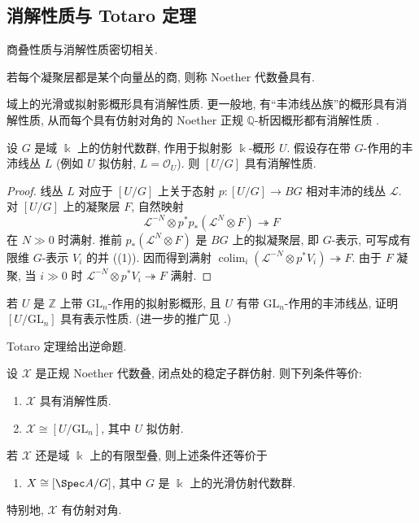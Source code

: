\subsection{消解性质与 Totaro 定理}\label{src:7.2.2-subsection}
商叠性质与消解性质密切相关.
\begin{definition}\label{src:7.2.9}
若每个凝聚层都是某个向量丛的商, 则称 Noether 代数叠具有.
\end{definition}
域上的光滑或拟射影概形具有消解性质. 更一般地, 有``丰沛线丛族''的概形具有消解性质, 从而每个具有仿射对角的 Noether 正规 $\mathbb Q$-析因概形都有消解性质 \cite{BS03}.
\begin{proposition}\label{src:7.2.10}
设 $G$ 是域 $\Bbbk$ 上的仿射代数群, 作用于拟射影 $\Bbbk$-概形 $U$. 假设存在带 $G$-作用的丰沛线丛 $L$ (例如 $U$ 拟仿射, $L=\mathcal O_U$). 则 $[U/G]$ 具有消解性质.
\end{proposition}
\begin{proof}
线丛 $L$ 对应于 $[U/G]$ 上关于态射 $p:[U/G]\to BG$ 相对丰沛的线丛 $\mathcal L$. 对 $[U/G]$ 上的凝聚层 $F$, 自然映射
\[
\mathcal L^{-N}\otimes p^*p_*(\mathcal L^N\otimes F)\twoheadrightarrow F
\]
在 $N\gg0$ 时满射. 推前 $p_*(\mathcal L^N\otimes F)$ 是 $BG$ 上的拟凝聚层, 即 $G$-表示, 可写成有限维 $G$-表示 $V_i$ 的并 ((1)). 因而得到满射 $\operatorname{colim}_i(\mathcal L^{-N}\otimes p^*V_i)\twoheadrightarrow F$. 由于 $F$ 凝聚, 当 $i\gg0$ 时 $\mathcal L^{-N}\otimes p^*V_i\twoheadrightarrow F$ 满射.
\end{proof}
\begin{exercise}\label{src:7.2.11}
若 $U$ 是 $\mathbb Z$ 上带 $\mathrm{GL}_n$-作用的拟射影概形, 且 $U$ 有带 $\mathrm{GL}_n$-作用的丰沛线丛, 证明 $[U/\mathrm{GL}_n]$ 具有表示性质. (进一步的推广见 \cite[\S2]{Tho87}.)
\end{exercise}
Totaro 定理给出逆命题.
\begin{theorem}[Totaro 定理]\label{src:7.2.12}
设 $\mathcal X$ 是正规 Noether 代数叠, 闭点处的稳定子群仿射. 则下列条件等价:
\begin{enumerate}[(1)]
\item $\mathcal X$ 具有消解性质.
\item $\mathcal X\cong[U/\mathrm{GL}_n]$, 其中 $U$ 拟仿射.
\end{enumerate}
若 $\mathcal X$ 还是域 $\Bbbk$ 上的有限型叠, 则上述条件还等价于
\begin{enumerate}[(3)]
\item $\mathcal X\cong[\Spec A/G]$, 其中 $G$ 是 $\Bbbk$ 上的光滑仿射代数群.
\end{enumerate}
特别地, $\mathcal X$ 有仿射对角.
\end{theorem}
